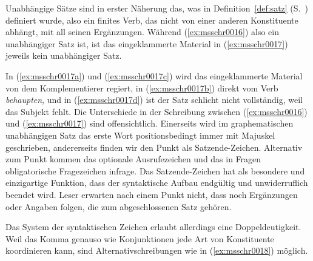 \label{sec:hauptsatzschreib}

Unabhängige Sätze sind in erster Näherung das, was in Definition~\ref{def:satz} (S.~\pageref{def:satz}) definiert wurde, also ein finites Verb, das nicht von einer anderen Konstituente abhängt, mit all seinen Ergänzungen.
Während (\ref{ex:msschr0016}) also ein unabhängiger Satz ist, ist das eingeklammerte Material in (\ref{ex:msschr0017}) jeweils kein unabhängiger Satz.

\begin{exe}
  \ex\label{ex:msschr0017}
  \begin{xlist}
  \end{xlist}
\end{exe}

In (\ref{ex:msschr0017a}) und (\ref{ex:msschr0017c}) wird das eingeklammerte Material von dem Komplementierer regiert, in (\ref{ex:msschr0017b}) direkt vom Verb \textit{behaupten}, und in (\ref{ex:msschr0017d}) ist der Satz schlicht nicht vollständig, weil das Subjekt fehlt.
Die Unterschiede in der Schreibung zwischen (\ref{ex:msschr0016}) und (\ref{ex:msschr0017}) sind offensichtlich.
Einerseits wird im graphematischen unabhängigen Satz das erste Wort positionsbedingt immer mit Majuskel geschrieben, andererseits finden wir den Punkt als Satzende-Zeichen.
Alternativ zum Punkt kommen das optionale Ausrufezeichen und das in Fragen obligatorische Fragezeichen infrage.
Das Satzende-Zeichen hat als besondere und einzigartige Funktion, dass der syntaktische Aufbau endgültig und unwiderruflich beendet wird.
Leser erwarten nach einem Punkt nicht, dass noch Ergänzungen oder Angaben folgen, die zum abgeschlossenen Satz gehören.

Das System der syntaktischen Zeichen erlaubt allerdings eine Doppeldeutigkeit.
Weil das Komma genauso wie Konjunktionen jede Art von Konstituente koordinieren kann, sind Alternativschreibungen wie in (\ref{ex:msschr0018}) möglich.

\begin{exe}
  \ex\label{ex:msschr0018} 
  \begin{xlist}
  \end{xlist}
\end{exe}

